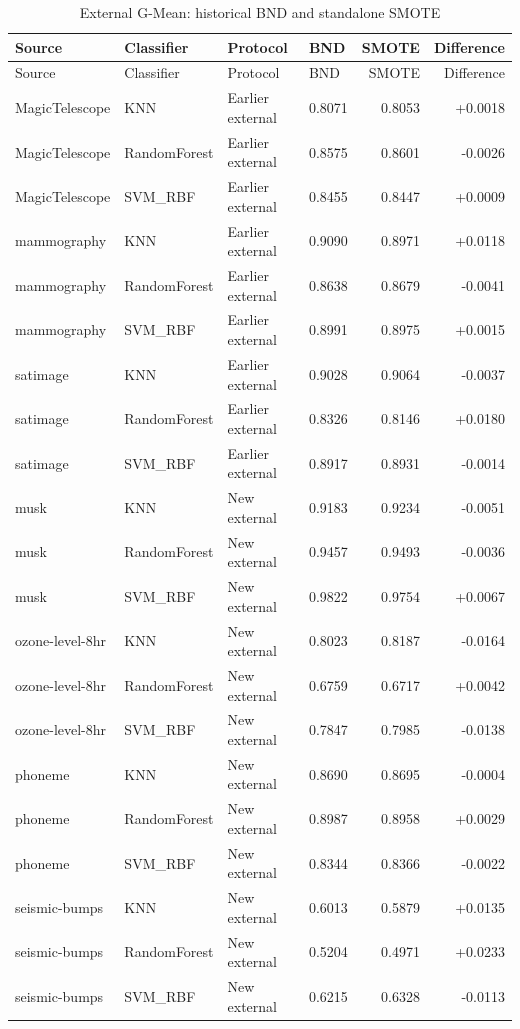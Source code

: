 \documentclass[10pt,a4paper]{article}
\begin{document}
\begingroup\small\setlength{\tabcolsep}{4pt}
\begin{longtable}{llllrr}
\caption{External G-Mean: historical BND and standalone SMOTE}\label{tab:s6}\\
\toprule
Source & Classifier & Protocol & BND & SMOTE & Difference \\
\midrule
\endfirsthead
\toprule
Source & Classifier & Protocol & BND & SMOTE & Difference \\
\midrule
\endhead
\bottomrule
\endlastfoot
MagicTelescope & KNN & Earlier external & 0.8071 & 0.8053 & +0.0018 \\
MagicTelescope & RandomForest & Earlier external & 0.8575 & 0.8601 & -0.0026 \\
MagicTelescope & SVM\_RBF & Earlier external & 0.8455 & 0.8447 & +0.0009 \\
mammography & KNN & Earlier external & 0.9090 & 0.8971 & +0.0118 \\
mammography & RandomForest & Earlier external & 0.8638 & 0.8679 & -0.0041 \\
mammography & SVM\_RBF & Earlier external & 0.8991 & 0.8975 & +0.0015 \\
satimage & KNN & Earlier external & 0.9028 & 0.9064 & -0.0037 \\
satimage & RandomForest & Earlier external & 0.8326 & 0.8146 & +0.0180 \\
satimage & SVM\_RBF & Earlier external & 0.8917 & 0.8931 & -0.0014 \\
musk & KNN & New external & 0.9183 & 0.9234 & -0.0051 \\
musk & RandomForest & New external & 0.9457 & 0.9493 & -0.0036 \\
musk & SVM\_RBF & New external & 0.9822 & 0.9754 & +0.0067 \\
ozone-level-8hr & KNN & New external & 0.8023 & 0.8187 & -0.0164 \\
ozone-level-8hr & RandomForest & New external & 0.6759 & 0.6717 & +0.0042 \\
ozone-level-8hr & SVM\_RBF & New external & 0.7847 & 0.7985 & -0.0138 \\
phoneme & KNN & New external & 0.8690 & 0.8695 & -0.0004 \\
phoneme & RandomForest & New external & 0.8987 & 0.8958 & +0.0029 \\
phoneme & SVM\_RBF & New external & 0.8344 & 0.8366 & -0.0022 \\
seismic-bumps & KNN & New external & 0.6013 & 0.5879 & +0.0135 \\
seismic-bumps & RandomForest & New external & 0.5204 & 0.4971 & +0.0233 \\
seismic-bumps & SVM\_RBF & New external & 0.6215 & 0.6328 & -0.0113 \\
\end{longtable}
\endgroup
\clearpage
\end{document}
